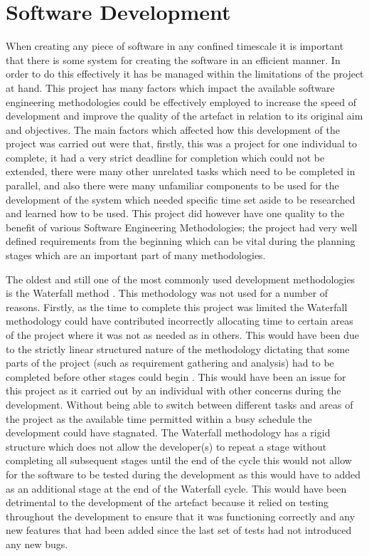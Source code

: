 \documentclass[11pt,a4paper]{report}
\begin{document}
\pagebreak

\section{Software Development}%
When creating any piece of software in any confined timescale it is important that there is some system for creating the software in an efficient manner. In order to do this effectively it has be managed within the limitations of the project at hand. This project has many factors which impact the available software engineering methodologies could be effectively employed to increase the speed of development and improve the quality of the artefact in relation to its original aim and objectives. The main factors which affected how this development of the project was carried out were that, firstly, this was a project for one individual to complete, it had a very strict deadline for completion which could not be extended, there were many other unrelated tasks which need to be completed in parallel, and also there were many unfamiliar components to be used for the development of the system which needed specific time set aside to be researched and learned how to be used. This project did however have one quality to the benefit of various Software Engineering Methodologies; the project had very well defined requirements from the beginning which can be vital during the planning stages which are an important part of many methodologies.

The oldest and still one of the most commonly used development methodologies is the Waterfall method \citep{shaydulin2017agile}. This methodology was not used for a number of reasons. Firstly, as the time to complete this project was limited the Waterfall methodology could have contributed incorrectly allocating time to certain areas of the project where it was not as needed as in others. This would have been due to the strictly linear structured nature of the methodology dictating that some parts of the project (such as requirement gathering and analysis) had to be completed before other stages could begin \citep{shaydulin2017agile}. This would have been an issue for this project as it carried out by an individual with other concerns during the development. Without being able to switch between different tasks and areas of the project as the available time permitted within a busy schedule the development could have stagnated. The Waterfall methodology has a rigid structure which does not allow the developer(s) to repeat a stage without completing all subsequent stages until the end of the cycle \citep{WaterfallPresentation} this would not allow for the software to be tested during the development as this would have to added as an additional stage at the end of the Waterfall cycle. This would have been detrimental to the development of the artefact because it relied on testing throughout the development to ensure that it was functioning correctly and any new features that had been added since the last set of tests had not introduced any new bugs.
\end{document}
